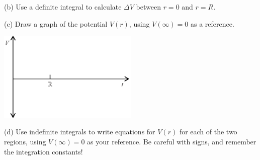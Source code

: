 (b) Use a definite integral to calculate $\Delta V$ between $r=0$ and $r=R$.
\vspace{1.1in}

(c) Draw a graph of the potential $V(r)$, using $V(\infty)=0$ as a reference.
\begin{center}
\includegraphics[width=0.5\textwidth]{finding_v_from_e/fig8.eps}
\end{center}

(d) Use indefinite integrals to write equations for $V(r)$ for each of the two regions, using $V(\infty)=0$ as your reference.  Be careful with signs, and remember the integration constants!
\vspace{1.3in}
